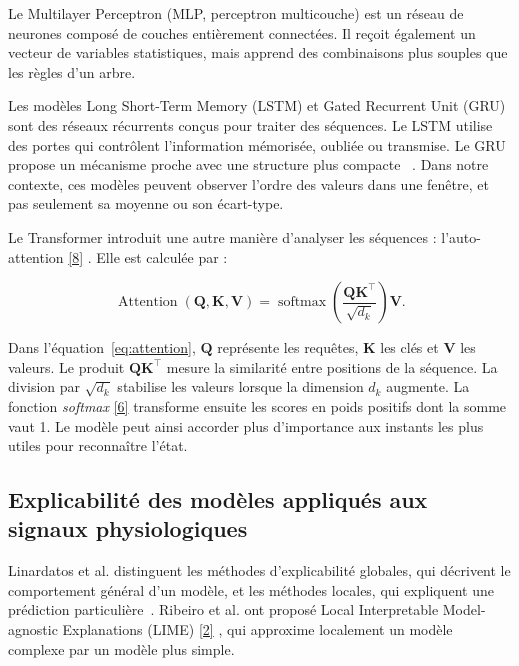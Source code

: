 \documentclass[12pt,a4paper]{article}
\newcommand{\openaccessref}[2]{%
  \nobreak\hspace{0.08em}%
  \href{#2}{\textcolor{green!35!black}{[#1]}}%
}
\begin{document}
Le Multilayer Perceptron (MLP, perceptron multicouche) est un réseau de
neurones composé de couches entièrement connectées. Il reçoit également un
vecteur de variables statistiques, mais apprend des combinaisons plus souples
que les règles d'un arbre.

Les modèles Long Short-Term Memory (LSTM) et Gated Recurrent Unit (GRU) sont
des réseaux récurrents conçus pour traiter des séquences. Le LSTM utilise des
portes qui contrôlent l'information mémorisée, oubliée ou transmise. Le GRU
propose un mécanisme proche avec une structure plus compacte
~\cite{goodfellow2016,cho2014}. Dans notre contexte, ces modèles peuvent
observer l'ordre des valeurs dans une fenêtre, et pas seulement sa moyenne ou
son écart-type.

Le Transformer introduit une autre manière d'analyser les séquences :
l'auto-attention\openaccessref{8}{https://arxiv.org/abs/1706.03762}. Elle est calculée par :

\begin{equation}
\operatorname{Attention}(\mathbf{Q},\mathbf{K},\mathbf{V})
=
\operatorname{softmax}
\left(
\frac{\mathbf{Q}\mathbf{K}^{\top}}{\sqrt{d_k}}
\right)\mathbf{V}.
\label{eq:attention}
\end{equation}

Dans l'équation~\ref{eq:attention}, $\mathbf{Q}$ représente les requêtes,
$\mathbf{K}$ les clés et $\mathbf{V}$ les valeurs. Le produit
$\mathbf{Q}\mathbf{K}^{\top}$ mesure la similarité entre positions de la
séquence. La division par $\sqrt{d_k}$ stabilise les valeurs lorsque la
dimension $d_k$ augmente. La fonction \emph{softmax}\openaccessref{6}{https://www.deeplearningbook.org} transforme ensuite les
scores en poids positifs dont la somme vaut 1. Le modèle peut ainsi accorder
plus d'importance aux instants les plus utiles pour reconnaître l'état.

\subsection{Explicabilité des modèles appliqués aux signaux physiologiques}

Linardatos et al. distinguent les méthodes d'explicabilité globales, qui
décrivent le comportement général d'un modèle, et les méthodes locales, qui
expliquent une prédiction particulière~\cite{linardatos2021}. Ribeiro et al.
ont proposé Local Interpretable Model-agnostic Explanations (LIME)\openaccessref{2}{https://arxiv.org/abs/1602.04938}, qui
approxime localement un modèle complexe par un modèle plus simple.
\end{document}
